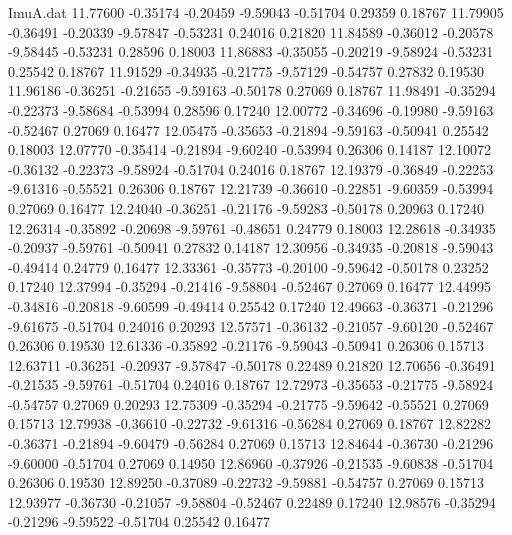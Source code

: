 \begin{filecontents}{ImuA.dat}
  11.77600   -0.35174   -0.20459   -9.59043   -0.51704    0.29359    0.18767
  11.79905   -0.36491   -0.20339   -9.57847   -0.53231    0.24016    0.21820
  11.84589   -0.36012   -0.20578   -9.58445   -0.53231    0.28596    0.18003
  11.86883   -0.35055   -0.20219   -9.58924   -0.53231    0.25542    0.18767
  11.91529   -0.34935   -0.21775   -9.57129   -0.54757    0.27832    0.19530
  11.96186   -0.36251   -0.21655   -9.59163   -0.50178    0.27069    0.18767
  11.98491   -0.35294   -0.22373   -9.58684   -0.53994    0.28596    0.17240
  12.00772   -0.34696   -0.19980   -9.59163   -0.52467    0.27069    0.16477
  12.05475   -0.35653   -0.21894   -9.59163   -0.50941    0.25542    0.18003
  12.07770   -0.35414   -0.21894   -9.60240   -0.53994    0.26306    0.14187
  12.10072   -0.36132   -0.22373   -9.58924   -0.51704    0.24016    0.18767
  12.19379   -0.36849   -0.22253   -9.61316   -0.55521    0.26306    0.18767
  12.21739   -0.36610   -0.22851   -9.60359   -0.53994    0.27069    0.16477
  12.24040   -0.36251   -0.21176   -9.59283   -0.50178    0.20963    0.17240
  12.26314   -0.35892   -0.20698   -9.59761   -0.48651    0.24779    0.18003
  12.28618   -0.34935   -0.20937   -9.59761   -0.50941    0.27832    0.14187
  12.30956   -0.34935   -0.20818   -9.59043   -0.49414    0.24779    0.16477
  12.33361   -0.35773   -0.20100   -9.59642   -0.50178    0.23252    0.17240
  12.37994   -0.35294   -0.21416   -9.58804   -0.52467    0.27069    0.16477
  12.44995   -0.34816   -0.20818   -9.60599   -0.49414    0.25542    0.17240
  12.49663   -0.36371   -0.21296   -9.61675   -0.51704    0.24016    0.20293
  12.57571   -0.36132   -0.21057   -9.60120   -0.52467    0.26306    0.19530
  12.61336   -0.35892   -0.21176   -9.59043   -0.50941    0.26306    0.15713
  12.63711   -0.36251   -0.20937   -9.57847   -0.50178    0.22489    0.21820
  12.70656   -0.36491   -0.21535   -9.59761   -0.51704    0.24016    0.18767
  12.72973   -0.35653   -0.21775   -9.58924   -0.54757    0.27069    0.20293
  12.75309   -0.35294   -0.21775   -9.59642   -0.55521    0.27069    0.15713
  12.79938   -0.36610   -0.22732   -9.61316   -0.56284    0.27069    0.18767
  12.82282   -0.36371   -0.21894   -9.60479   -0.56284    0.27069    0.15713
  12.84644   -0.36730   -0.21296   -9.60000   -0.51704    0.27069    0.14950
  12.86960   -0.37926   -0.21535   -9.60838   -0.51704    0.26306    0.19530
  12.89250   -0.37089   -0.22732   -9.59881   -0.54757    0.27069    0.15713
  12.93977   -0.36730   -0.21057   -9.58804   -0.52467    0.22489    0.17240
  12.98576   -0.35294   -0.21296   -9.59522   -0.51704    0.25542    0.16477

\end{filecontents}
